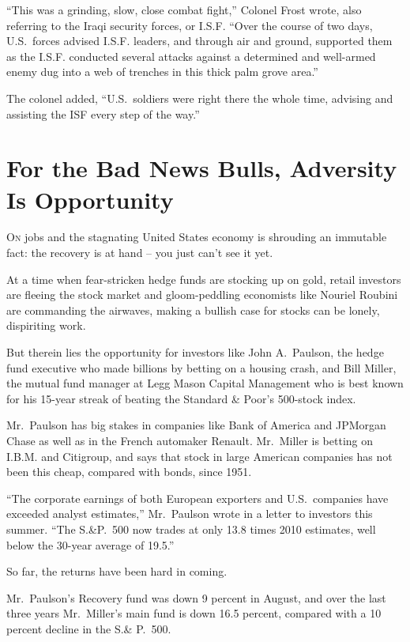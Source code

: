 ﻿\documentclass[12pt]{article}
\begin{document}
``This was a grinding, slow, close combat fight,'' Colonel Frost wrote, also referring to the Iraqi
security forces, or I.S.F. ``Over the course of two days, U.S.~forces advised I.S.F. leaders, and
through air and ground, supported them as the I.S.F. conducted several attacks against a determined
and well-armed enemy dug into a web of trenches in this thick palm grove area.''

The colonel added, ``U.S.~soldiers were right there the whole time, advising and assisting the ISF
every step of the way.''

\pagebreak
\section{For the Bad News Bulls, Adversity Is Opportunity }

\lettrine{O}{n} jobs and the stagnating United States economy is shrouding
an immutable fact: the recovery is at hand -- you just can't see it yet.

At a time when fear-stricken hedge funds are stocking up on gold, retail investors are fleeing the
stock market and gloom-peddling economists like Nouriel Roubini are commanding the airwaves, making
a bullish case for stocks can be lonely, dispiriting work.

But therein lies the opportunity for investors like John A.~Paulson, the hedge fund executive who
made billions by betting on a housing crash, and Bill Miller, the mutual fund manager at Legg Mason
Capital Management who is best known for his 15-year streak of beating the Standard \& Poor's
500-stock index.

Mr.~Paulson has big stakes in companies like Bank of America and JPMorgan Chase as well as in the
French automaker Renault. Mr.~Miller is betting on I.B.M. and Citigroup, and says that stock in
large American companies has not been this cheap, compared with bonds, since 1951.

``The corporate earnings of both European exporters and U.S.~companies have exceeded analyst
estimates,'' Mr.~Paulson wrote in a letter to investors this summer. ``The S.\&P.~500 now trades at
only 13.8 times 2010 estimates, well below the 30-year average of 19.5.''

So far, the returns have been hard in coming.

Mr.~Paulson's Recovery fund was down 9 percent in August, and over the last three years Mr.~Miller's
main fund is down 16.5 percent, compared with a 10 percent decline in the S.\& P.~500.
\end{document}
